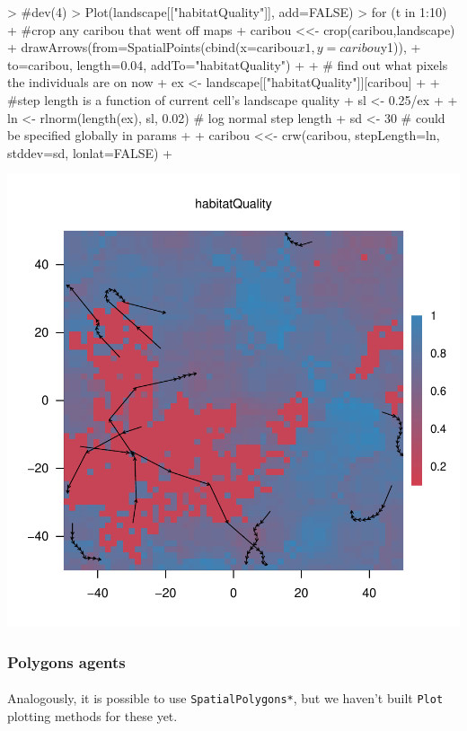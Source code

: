 \documentclass{article}
\begin{document}
\begin{Schunk}
\begin{Sinput}
> #dev(4)
> Plot(landscape[["habitatQuality"]], add=FALSE)
> for (t in 1:10) {
+   #crop any caribou that went off maps
+   caribou <<- crop(caribou,landscape)
+   drawArrows(from=SpatialPoints(cbind(x=caribou$x1, y=caribou$y1)),
+              to=caribou, length=0.04, addTo="habitatQuality")
+
+   # find out what pixels the individuals are on now
+   ex <- landscape[["habitatQuality"]][caribou]
+
+   #step length is a function of current cell's landscape quality
+   sl <- 0.25/ex
+
+   ln <- rlnorm(length(ex), sl, 0.02) # log normal step length
+   sd <- 30 # could be specified globally in params
+
+   caribou <<- crw(caribou, stepLength=ln, stddev=sd, lonlat=FALSE)
+ }
\end{Sinput}
\end{Schunk}
\includegraphics{introduction-agent-crw-trajectory}

\subsubsection{Polygons agents}

\paragraph{}
Analogously, it is possible to use \texttt{SpatialPolygons*}, but we haven't built \texttt{Plot} plotting methods for these yet.
\end{document}
